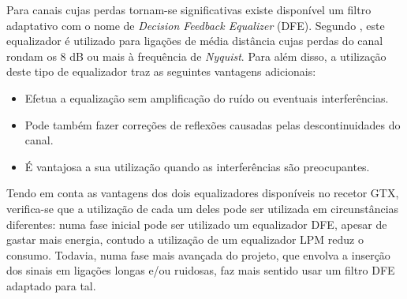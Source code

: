 Para canais cujas perdas tornam-se significativas existe disponível um filtro adaptativo com o nome de\textit{ Decision Feedback Equalizer} (DFE). 
Segundo \cite{R011}, este equalizador é utilizado para ligações de média distância cujas perdas do canal rondam os 8 dB ou mais à frequência de \textit{Nyquist}. Para além disso, a utilização deste tipo de equalizador traz as seguintes vantagens adicionais:
\begin{itemize}
	\item Efetua a equalização sem amplificação do ruído ou eventuais interferências.
	\item Pode também fazer correções de reflexões causadas pelas descontinuidades do canal. 
	\item É vantajosa a sua utilização quando as interferências são preocupantes.
\end{itemize}


Tendo em conta as vantagens dos dois equalizadores disponíveis no recetor GTX, verifica-se que a utilização de cada um deles pode ser utilizada em circunstâncias diferentes: numa fase inicial pode ser utilizado um equalizador DFE, apesar de gastar mais energia, contudo a utilização de um equalizador LPM reduz o consumo. Todavia, numa fase mais avançada do projeto, que envolva a inserção dos sinais em ligações longas e/ou ruidosas, faz mais sentido usar um filtro DFE adaptado para tal. 

%

